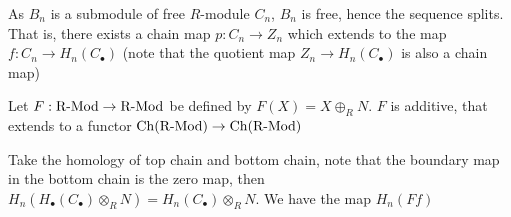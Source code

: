 \documentclass{article}
\begin{document}
\begin{center}
\end{center}

As $B_n$ is a submodule of free $R$-module $C_n$, $B_n$ is free, hence the sequence splits. That is, there exists a chain map $p: C_n \to Z_n$ which extends to the map $f: C_n \to H_n(C_\bullet)$ (note that the quotient map $Z_n \to H_n(C_\bullet)$ is also a chain map)

\begin{center}
\end{center}

\begin{center}
\end{center}

Let $F: \operatorname{R-Mod} \to \operatorname{R-Mod}$ be defined by $F(X) = X \oplus_R N$. $F$ is additive, that extends to a functor $\operatorname{Ch}(\operatorname{R-Mod}) \to \operatorname{Ch}(\operatorname{R-Mod})$

\begin{center}
\end{center}

Take the homology of top chain and bottom chain, note that the boundary map in the bottom chain is the zero map, then $H_n(H_\bullet(C_\bullet) \otimes_R N) = H_n(C_\bullet) \otimes_R N$. We have the map $H_n(Ff)$
\end{document}
